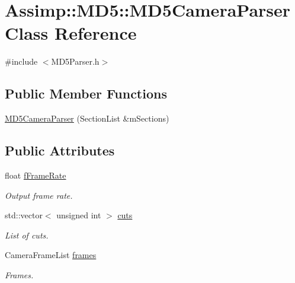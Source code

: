 \hypertarget{class_assimp_1_1_m_d5_1_1_m_d5_camera_parser}{\section{Assimp\+:\+:M\+D5\+:\+:M\+D5\+Camera\+Parser Class Reference}
\label{class_assimp_1_1_m_d5_1_1_m_d5_camera_parser}
}


{\ttfamily \#include $<$M\+D5\+Parser.\+h$>$}

\subsection*{Public Member Functions}
\begin{DoxyCompactItemize}
\item 
\hyperlink{class_assimp_1_1_m_d5_1_1_m_d5_camera_parser_a4c0976289add66284f39d02e3736b0b3}{M\+D5\+Camera\+Parser} (Section\+List \&m\+Sections)
\end{DoxyCompactItemize}
\subsection*{Public Attributes}
\begin{DoxyCompactItemize}
\item 
\hypertarget{class_assimp_1_1_m_d5_1_1_m_d5_camera_parser_ae1309a73b5ae982132ffa70f2019f4e0}{float \hyperlink{class_assimp_1_1_m_d5_1_1_m_d5_camera_parser_ae1309a73b5ae982132ffa70f2019f4e0}{f\+Frame\+Rate}}\label{class_assimp_1_1_m_d5_1_1_m_d5_camera_parser_ae1309a73b5ae982132ffa70f2019f4e0}

\begin{DoxyCompactList}\small\item\em Output frame rate. \end{DoxyCompactList}\item 
\hypertarget{class_assimp_1_1_m_d5_1_1_m_d5_camera_parser_a7e66c18db2c23776eef690dfe7139181}{std\+::vector$<$ unsigned int $>$ \hyperlink{class_assimp_1_1_m_d5_1_1_m_d5_camera_parser_a7e66c18db2c23776eef690dfe7139181}{cuts}}\label{class_assimp_1_1_m_d5_1_1_m_d5_camera_parser_a7e66c18db2c23776eef690dfe7139181}

\begin{DoxyCompactList}\small\item\em List of cuts. \end{DoxyCompactList}\item 
\hypertarget{class_assimp_1_1_m_d5_1_1_m_d5_camera_parser_a442127536fdef2996acff92a2947ecb1}{Camera\+Frame\+List \hyperlink{class_assimp_1_1_m_d5_1_1_m_d5_camera_parser_a442127536fdef2996acff92a2947ecb1}{frames}}\label{class_assimp_1_1_m_d5_1_1_m_d5_camera_parser_a442127536fdef2996acff92a2947ecb1}

\begin{DoxyCompactList}\small\item\em Frames. \end{DoxyCompactList}\end{DoxyCompactItemize}


